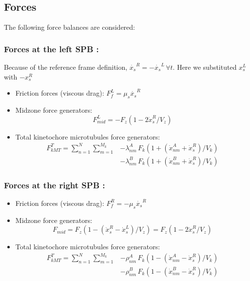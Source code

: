 \documentclass[a4paper,12pt]{article}
\begin{document}
\subsection{Forces}

The following force balances are considered:

\subsubsection{Forces at the left SPB :}

Because of the reference frame definition, $\dot{x_s}^R =
-\dot{x_s}^L\,\forall t$. Here we substituted $x_s^L$ with $-x_s^R$
\begin{itemize}
\item Friction forces (viscous drag):  $F_f^L = \mu_s \dot{x_s}^R$
\item Midzone force generators: 
  $$F_{mid}^L = - F_z\left(1 - 2\dot{x}^R_s / V_z\right) $$
\item Total kinetochore microtubules force generators:
$$  \begin{aligned}
    F_{kMT}^T = \sum_{n = 1}^{N}\sum_{m = 1}^{M_k} & - \lambda_{nm}^A\,F_k\left(1 +
      (\dot{x}^A_{nm} + \dot{x}^R_s)/V_k\right)\\
    & - \lambda_{nm}^B\,F_k\left(1 +
      (\dot{x}^B_{nm} + \dot{x}^R_s)/V_k\right)
  \end{aligned}
$$
\end{itemize}
\subsubsection{Forces at the right SPB :}

\begin{itemize}
\item Friction forces (viscous drag):  $F_f^R = -\mu_s \dot{x_s}^R$
\item Midzone force generators: 
  $$F_{mid} = F_z\left(1 - (\dot{x}^R_s - \dot{x}_s^L)/V_z\right) =
  F_z\left(1 - 2\dot{x}^R_s / V_z\right) $$
\item Total kinetochore microtubules force generators:
 $$ \begin{aligned}
    F_{kMT}^T = \sum_{n = 1}^{N}\sum_{m = 1}^{M_k} & - \rho_{nm}^A\,F_k\left( 1 -
      (\dot{x}^A_{nm} - \dot{x}^R_s)/V_k\right)\\
    & - \rho_{nm}^B\,F_k\left( 1 -
      (\dot{x}^B_{nm} - \dot{x}^R_s)/V_k\right)\\
 \end{aligned} $$
\end{itemize}
\end{document}
